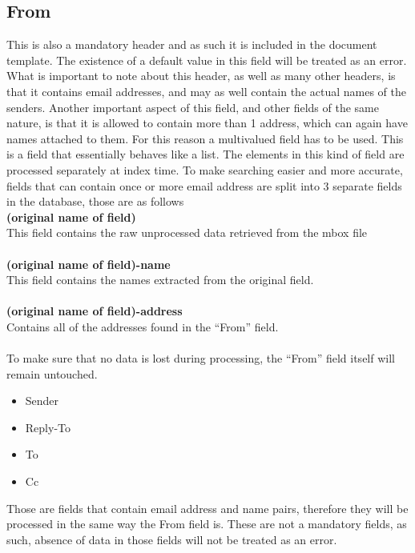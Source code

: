 \documentclass[a4paper,english]{report}
\begin{document}
\noindent
\subsection{From}
This is also a mandatory header and as such it is included in the document template.
The existence of a default value in this field will be treated as an error.
What is important to note about this header, as well as many other headers, is that it contains email addresses, and may as well contain the actual names of the senders. Another important aspect of this field, and other fields of the same nature, is that it is allowed to contain more than 1 address, which can again have names attached to them. 
For this reason a multivalued field has to be used. This is a field that essentially behaves like a list. The elements in this kind of field are processed separately at index time.
To make searching easier and more accurate, fields that can contain once or more email address are split into 3 separate fields in the database, those are as follows\\


\noindent
\textbf{(original name of field)}\\
This field contains the raw unprocessed data retrieved from the mbox file\\\\ 
\noindent
\textbf{(original name of field)-name}\\
This field contains the names extracted from the original field.\\\\
\noindent
\textbf{(original name of field)-address}\\ 
\noindent
Contains all of the addresses found in the “From” field.\\\\
\noindent
To make sure that no data is lost during processing, the “From” field itself will remain untouched.

\begin{itemize}
\item Sender
\item Reply-To
\item To
\item Cc
\end{itemize}
Those are fields that contain email address and name pairs, therefore they will be processed in the same way the From field is. These are not a mandatory fields, as such, absence of data in those fields will not be treated as an error.\\
\end{document}
